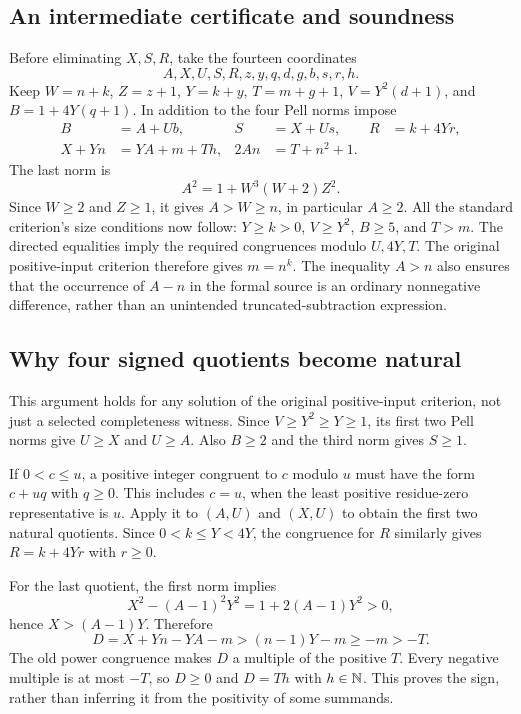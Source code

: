 \subsection{An intermediate certificate and soundness}
Before eliminating $X,S,R$, take the fourteen coordinates
\[
 A,X,U,S,R,z,y,q,d,g,b,s,r,h.
\]
Keep $W=n+k$, $Z=z+1$, $Y=k+y$, $T=m+g+1$, $V=Y^2(d+1)$,
and $B=1+4Y(q+1)$. In addition to the four Pell norms impose
\begin{align*}
 B&=A+Ub,&S&=X+Us,&R&=k+4Yr,\\
 X+Yn&=YA+m+Th,&2An&=T+n^2+1.
\end{align*}
The last norm is
\[
 A^2=1+W^3(W+2)Z^2.
\]
Since $W\ge2$ and $Z\ge1$, it gives $A>W\ge n$, in particular
$A\ge2$. All the standard criterion's size conditions now follow:
$Y\ge k>0$, $V\ge Y^2$, $B\ge5$, and $T>m$.
The directed equalities imply the required congruences modulo
$U,4Y,T$. The original positive-input criterion therefore gives $m=n^k$.
The inequality $A>n$ also ensures that the occurrence of $A-n$ in the
formal source is an ordinary nonnegative difference, rather than an
unintended truncated-subtraction expression.

\subsection{Why four signed quotients become natural}
This argument holds for any solution of the original positive-input
criterion, not just a selected completeness witness. Since
$V\ge Y^2\ge Y\ge1$, its first two Pell norms give $U\ge X$ and
$U\ge A$. Also $B\ge2$ and the third norm gives $S\ge1$.

If $0<c\le u$, a positive integer congruent to $c$ modulo $u$ must
have the form $c+uq$ with $q\ge0$. This includes $c=u$, when the least
positive residue-zero representative is $u$. Apply it to $(A,U)$ and
$(X,U)$ to obtain the first two natural quotients. Since
$0<k\le Y<4Y$, the congruence for $R$ similarly gives $R=k+4Yr$ with
$r\ge0$.

For the last quotient, the first norm implies
\[
 X^2-(A-1)^2Y^2=1+2(A-1)Y^2>0,
\]
hence $X>(A-1)Y$. Therefore
\[
 D=X+Yn-YA-m>(n-1)Y-m\ge-m>-T.
\]
The old power congruence makes $D$ a multiple of the positive $T$.
Every negative multiple is at most $-T$, so $D\ge0$ and $D=Th$ with
$h\in\mathbb N$. This proves the sign, rather than inferring it from the
positivity of some summands.

